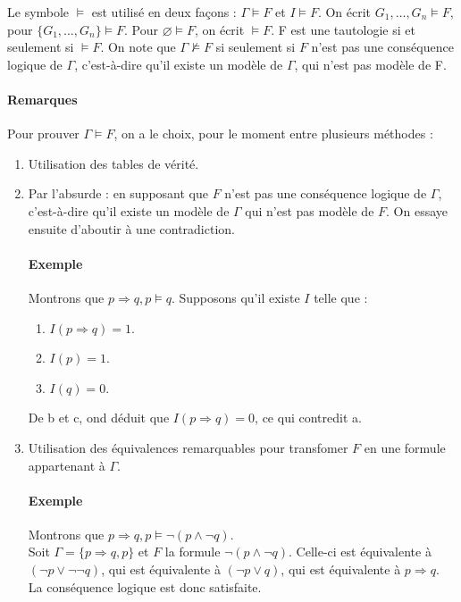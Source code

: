 \documentclass[11pt,twoside,openright,a4paper]{report}
\begin{document}
Le symbole $\vDash$ est utilisé en deux façons : $\Gamma \vDash F$ et $I \vDash F$. On écrit $G_1, \ldots, G_n \vDash F$, pour $\{G_1, \ldots, G_n\} \vDash F$. Pour $\varnothing \vDash F$, on écrit $ \vDash F$. F est une tautologie si et seulement si $ \vDash F$. On note que $\Gamma \not \vDash F$ si seulement si $F$ n'est pas une conséquence logique de $\Gamma$, c'est-à-dire qu'il existe un modèle de $\Gamma$, qui n'est pas modèle de F.


\paragraph{Remarques} %
\label{par:remarques}

Pour prouver $\Gamma \vDash F$, on a le choix, pour le moment entre plusieurs méthodes :

\begin{enumerate}
	\item Utilisation des tables de vérité.
	\item Par l'absurde : en supposant que $F$ n'est pas une conséquence logique de $\Gamma$, c'est-à-dire qu'il existe un modèle de $\Gamma$ qui n'est pas modèle de $F$. On essaye ensuite d'aboutir à une contradiction.

	\paragraph{Exemple} %
	\label{par:exemple}
	Montrons que $p \Rightarrow q, p \vDash q$. Supposons qu'il existe $I$ telle que :

	\begin{enumerate}
		\item $I(p \Rightarrow q)=1$.
		\item $I(p)=1$.
		\item $I(q)=0$.
	\end{enumerate}

	De b et c, ond déduit que $I(p \Rightarrow q)=0$, ce qui contredit a.


	\item Utilisation des équivalences remarquables pour transfomer $F$ en une formule appartenant à $\Gamma$.

	\paragraph{Exemple} %
	\label{par:exemple}

	Montrons que $p \Rightarrow q, p \vDash \neg(p \land \neg q)$.\\
	Soit $\Gamma=\{p \Rightarrow q, p\}$ et $F$ la formule $\neg(p \land \neg q)$. Celle-ci est équivalente à $(\neg p \lor \neg \neg q)$, qui est équivalente à $(\neg p \lor q)$, qui est équivalente à $p \Rightarrow q$.\\
	La conséquence logique est donc satisfaite.

\end{enumerate}


\end{document}
